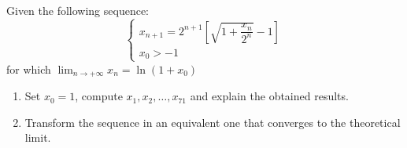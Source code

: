 \documentclass[12pt, a4paper]{report}
\newtheorem[style=M,bodystyle=\normalfont]{theorem}{Theorem}
\newtheorem[style=M,bodystyle=\normalfont]{corollary}{Corollary}
\newtheorem[style=M,bodystyle=\normalfont]{lemma}{Lemma}
\newtheorem[style=M,bodystyle=\normalfont]{definition}{Definition}
\begin{document}
    \newpage

    \begin{Exercise}[label=13]
        Given the following sequence:
        \[
          \begin{cases}
                x_{n+1}=2^{n+1}\left[ \sqrt{1+\dfrac{x_n}{2^n}}-1 \right] \\
                x_0>-1
          \end{cases}  
        \]
        for which $\lim_{n \rightarrow + \infty}x_n=\ln\left({1+x_0}\right)$
        \begin{enumerate}
            \item Set $x_0 = 1$, compute $x_1, x_2, \dots , x_{71}$ and explain the obtained results.
            \item Transform the sequence in an equivalent one that converges to the theoretical limit.
        \end{enumerate}


    \end{Exercise}
\end{document}
